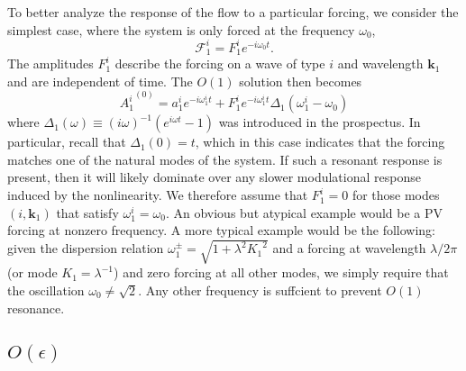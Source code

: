 \documentclass[letterpaper, 11pt]{article}
\begin{document}
To better analyze the response of the flow to a particular forcing, we consider the simplest case, where the system is only forced at the frequency $\omega_0$,
\begin{equation}
\mathcal{F}^i_1 = F^i_1 e^{-i \omega_0 t}.
\end{equation}
The amplitudes $F^i_1$ describe the forcing on a wave of type $i$ and wavelength $\mathbf{k}_1$ and are independent of time. The $O(1)$ solution then becomes
\begin{equation}
{A^i_1}^{(0)} = a^i_1 e^{-i \omega^i_1 t} + F^i_1 e^{-i \omega^i_1 t} \Delta_1(\omega^i_1 - \omega_0)
\end{equation}
where $\Delta_1(\omega) \equiv (i\omega)^{-1} \left(e^{i \omega t} - 1\right)$ was introduced in the prospectus. In particular, recall that $\Delta_1(0) = t$, which in this case indicates that the forcing matches one of the natural modes of the system. If such a resonant response is present, then it will likely dominate over any slower modulational response induced by the nonlinearity. We therefore assume that $F^i_1 = 0$ for those modes $(i,\mathbf{k}_1)$ that satisfy $\omega^i_1 = \omega_0$. An obvious but atypical example would be a PV forcing at nonzero frequency. A more typical example would be the following: given the dispersion relation $\omega^\pm_1 = \sqrt{1 + \lambda^2 {K_1}^2}$ and a forcing at wavelength $\lambda/2\pi$ (or mode $K_1 = \lambda^{-1}$) and zero forcing at all other modes, we simply require that the oscillation $\omega_0 \neq \sqrt{2}$. Any other frequency is suffcient to prevent $O(1)$ resonance.

\subsection{$O(\epsilon)$}
\end{document}
